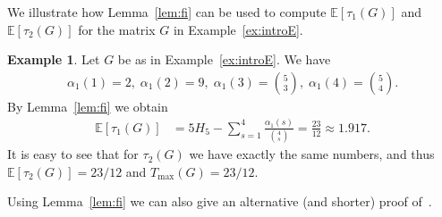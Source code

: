 \documentclass[11pt,a4paper,reqno,twoside]{amsart}
\theoremstyle{definition}
\newtheorem{example}{Example}
\newcommand{\E}{\mathbb{E}}
\newcommand{\tmax}{T_{\max}}
\begin{document}
We illustrate 
how Lemma~\ref{lem:fi} can be used to compute $\E[\tau_1(G)]$ and $\E[\tau_2(G)]$ for the matrix $G$ in Example~\ref{ex:introE}.

\begin{example}
Let $G$ be as in Example~\ref{ex:introE}.
We have
\begin{align*}
\alpha_1(1) = 2, \; \alpha_1(2) = 9, \; \alpha_1(3) = \binom{5}{3}, \; \alpha_1(4) = \binom{5}{4}.
\end{align*}
By Lemma~\ref{lem:fi} we obtain 
\begin{align*}
    \E[\tau_1(G)] &= 5 H_5 - \sum_{s=1}^{4} \displaystyle \frac{\alpha_1(s)}{\binom{4}{s}} 
    = \frac{23}{12} \approx 1.917.
\end{align*}
It is easy to see that for $\tau_2(G)$ we have exactly the same numbers, and thus $\E[\tau_2(G)] = 23/12$ and $\tmax(G) = 23/12.$
\end{example}


Using Lemma~\ref{lem:fi} we can also give an alternative (and shorter) proof of~\cite[Theorem 9]{bar2023cover}.
\end{document}
